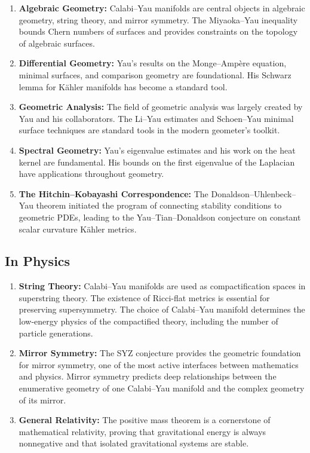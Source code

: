 \begin{enumerate}
    \item \textbf{Algebraic Geometry:} Calabi--Yau manifolds are central objects in algebraic geometry, string theory, and mirror symmetry. The Miyaoka--Yau inequality bounds Chern numbers of surfaces and provides constraints on the topology of algebraic surfaces.
    \item \textbf{Differential Geometry:} Yau's results on the Monge--Amp\`ere equation, minimal surfaces, and comparison geometry are foundational. His Schwarz lemma for K\"ahler manifolds has become a standard tool.
    \item \textbf{Geometric Analysis:} The field of geometric analysis was largely created by Yau and his collaborators. The Li--Yau estimates and Schoen--Yau minimal surface techniques are standard tools in the modern geometer's toolkit.
    \item \textbf{Spectral Geometry:} Yau's eigenvalue estimates and his work on the heat kernel are fundamental. His bounds on the first eigenvalue of the Laplacian have applications throughout geometry.
    \item \textbf{The Hitchin--Kobayashi Correspondence:} The Donaldson--Uhlenbeck--Yau theorem initiated the program of connecting stability conditions to geometric PDEs, leading to the Yau--Tian--Donaldson conjecture on constant scalar curvature K\"ahler metrics.
\end{enumerate}

\subsection{In Physics}

\begin{enumerate}
    \item \textbf{String Theory:} Calabi--Yau manifolds are used as compactification spaces in superstring theory. The existence of Ricci-flat metrics is essential for preserving supersymmetry. The choice of Calabi--Yau manifold determines the low-energy physics of the compactified theory, including the number of particle generations.
    \item \textbf{Mirror Symmetry:} The SYZ conjecture provides the geometric foundation for mirror symmetry, one of the most active interfaces between mathematics and physics. Mirror symmetry predicts deep relationships between the enumerative geometry of one Calabi--Yau manifold and the complex geometry of its mirror.
    \item \textbf{General Relativity:} The positive mass theorem is a cornerstone of mathematical relativity, proving that gravitational energy is always nonnegative and that isolated gravitational systems are stable.
\end{enumerate}

